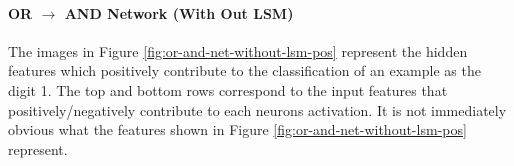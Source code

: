 \begin{minipage}[t]{0.3\textwidth}
	\vspace{0px}
\paragraph{OR $\rightarrow$ AND Network (With Out LSM)}
The images in Figure \ref{fig:or-and-net-without-lsm-pos} represent the hidden 
features which positively contribute to the classification of an example as the digit 1. The top and bottom rows correspond to the input features that positively/negatively contribute to each neurons activation. It is not immediately obvious what the features shown in Figure \ref{fig:or-and-net-without-lsm-pos} represent.\\
\end{minipage}
\hspace{0.1\textwidth}
